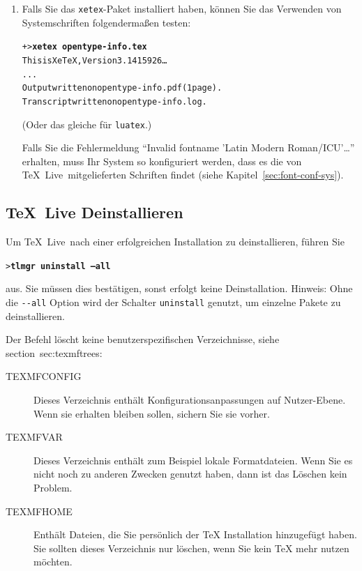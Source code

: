 \documentclass[12pt,ngerman,a4paper,fullparskip]{scrreprt}
\newcommand{\TL}{\TeX\ Live\xspace}
\newcommand{\code}[1]{\texttt{#1}}
\newcommand{\filename}[1]{\texttt{#1}}
\newcommand{\Ucom}[1]{\textbf{\texttt{#1}}}
\begin{document}
\begin{enumerate}
\item Falls Sie das \filename{xetex}-Paket installiert haben, können Sie
das Verwenden von Systemschriften folgendermaßen testen:
\begin{alltt}
+> \Ucom{xetex opentype-info.tex}
This is XeTeX, Version 3.1415926\dots
...
Output written on opentype-info.pdf (1 page).
Transcript written on opentype-info.log.
\end{alltt}

(Oder das gleiche für \filename{luatex}.)

Falls Sie die Fehlermeldung \enquote{Invalid fontname 'Latin Modern
Roman/ICU'\dots} erhalten, muss Ihr System so konfiguriert werden, dass
es die von \TL\ mitgelieferten Schriften findet (siehe Kapitel~\ref{sec:font-conf-sys}).
\end{enumerate}

\subsection{\TL Deinstallieren}
\label{sec:uninstall}

Um \TL\ nach einer erfolgreichen Installation zu deinstallieren, führen Sie

\begin{alltt}
> \Ucom{tlmgr uninstall --all}
\end{alltt}

aus. Sie müssen dies bestätigen, sonst erfolgt keine Deinstallation. Hinweis:
Ohne die \code{-{}-all} Option wird der Schalter \code{uninstall} genutzt, um einzelne Pakete zu deinstallieren.

Der Befehl löscht keine benutzerspezifischen Verzeichnisse, siehe section~{sec:texmftrees}:

\begin{description}
\item [TEXMFCONFIG] Dieses Verzeichnis enthält Konfigurationsanpassungen auf Nutzer-Ebene. Wenn sie erhalten bleiben sollen, sichern Sie sie vorher.

\item [TEXMFVAR] Dieses Verzeichnis enthält zum Beispiel lokale Formatdateien. Wenn Sie es nicht noch zu anderen Zwecken genutzt haben, dann ist das Löschen kein Problem.

\item[TEXMFHOME] Enthält Dateien, die Sie persönlich der TeX Installation hinzugefügt haben. Sie sollten dieses Verzeichnis nur löschen, wenn Sie kein TeX mehr nutzen möchten.

\end{description}
\end{document}
